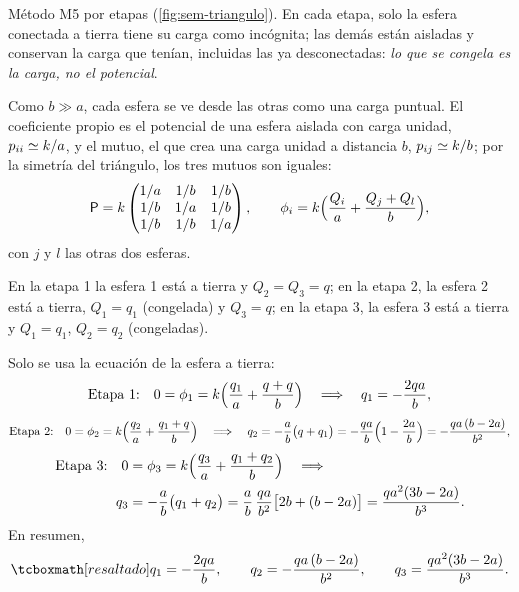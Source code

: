 \begin{resolucion}
 Método M5 por etapas (\cref{fig:sem-triangulo}). En cada etapa, solo la esfera conectada a tierra tiene su carga como incógnita; las demás están
aisladas y conservan la carga que tenían, incluidas las ya desconectadas: \emph{lo que se congela es la carga, no el potencial}.

 Como $b\gg a$, cada esfera se ve desde las otras como una carga puntual. El coeficiente propio es el
potencial de una esfera aislada con carga unidad, $p_{ii}\simeq k/a$, y el mutuo, el que crea una carga unidad a distancia $b$, $p_{ij}\simeq k/b$; por la
simetría del triángulo, los tres mutuos son iguales:
\[
  \mathsf{P}=k\begin{pmatrix}1/a & 1/b & 1/b\\ 1/b & 1/a & 1/b\\ 1/b & 1/b & 1/a\end{pmatrix},\qquad
  \phi_i=k\Bigl(\frac{Q_i}{a}+\frac{Q_j+Q_l}{b}\Bigr),
\]
con $j$ y $l$ las otras dos esferas.

 En la etapa 1 la esfera 1 está a tierra y $Q_2=Q_3=q$; en la etapa 2, la esfera 2 está a tierra, $Q_1=q_1$
(congelada) y $Q_3=q$; en la etapa 3, la esfera 3 está a tierra y $Q_1=q_1$, $Q_2=q_2$ (congeladas).

 Solo se usa la ecuación de la esfera a tierra:
\[
  \text{Etapa 1:}\quad0=\phi_1=k\Bigl(\frac{q_1}{a}+\frac{q+q}{b}\Bigr)\quad\Longrightarrow\quad q_1=-\frac{2qa}{b},
\]
\[
  \text{Etapa 2:}\quad0=\phi_2=k\Bigl(\frac{q_2}{a}+\frac{q_1+q}{b}\Bigr)\quad\Longrightarrow\quad
  q_2=-\frac{a}{b}\bigl(q+q_1\bigr)=-\frac{qa}{b}\Bigl(1-\frac{2a}{b}\Bigr)=-\frac{qa\,(b-2a)}{b^{2}},
\]
\begin{align*}
  \text{Etapa 3:}\quad0&=\phi_3=k\Bigl(\frac{q_3}{a}+\frac{q_1+q_2}{b}\Bigr)\quad\Longrightarrow\\
  q_3&=-\frac{a}{b}\bigl(q_1+q_2\bigr)=\frac{a}{b}\,\frac{qa}{b^{2}}\bigl[2b+(b-2a)\bigr]=\frac{qa^{2}(3b-2a)}{b^{3}} .
\end{align*}
En resumen,
\[
  \resalta{q_1=-\frac{2qa}{b},\qquad q_2=-\frac{qa\,(b-2a)}{b^{2}},\qquad q_3=\frac{qa^{2}(3b-2a)}{b^{3}} .}
\]
\end{resolucion}



